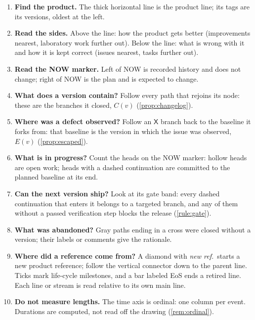 \begin{enumerate}[label=\textbf{Q\arabic*},leftmargin=*,itemsep=2pt,topsep=3pt]
  \item \textbf{Find the product.} The thick horizontal line is the product
        line; its tags are its versions, oldest at the left.
  \item \textbf{Read the sides.} Above the line: how the product gets
        better (improvements nearest, laboratory work further out). Below
        the line: what is wrong with it and how it is kept correct (issues
        nearest, tasks further out).
  \item \textbf{Read the NOW marker.} Left of NOW is recorded history and
        does not change; right of NOW is the plan and is expected to change.
  \item \textbf{What does a version contain?} Follow every path that
        rejoins its node: these are the branches it closed, $C(v)$
        (\cref{prop:changelog}).
  \item \textbf{Where was a defect observed?} Follow an $\mathsf{X}$
        branch back to the baseline it forks from: that baseline is the
        version in which the issue was observed, $E(v)$
        (\cref{prop:escaped}).
  \item \textbf{What is in progress?} Count the heads on the NOW marker:
        hollow heads are open work; heads with a dashed continuation are
        committed to the planned baseline at its end.
  \item \textbf{Can the next version ship?} Look at its gate band: every
        dashed continuation that enters it belongs to a targeted branch,
        and any of them without a passed verification step blocks the
        release (\cref{rule:gate}).
  \item \textbf{What was abandoned?} Gray paths ending in a cross were
        closed without a version; their labels or comments give the
        rationale.
  \item \textbf{Where did a reference come from?} A diamond with
        \emph{new ref.}\ starts a new product reference; follow the
        vertical connector down to the parent line. Ticks mark life-cycle
        milestones, and a bar labeled \textsf{EoS} ends a retired line.
        Each line or stream is read relative to its own main line.
  \item \textbf{Do not measure lengths.} The time axis is ordinal: one
        column per event. Durations are computed, not read off the drawing
        (\cref{rem:ordinal}).
\end{enumerate}

\clearpage
